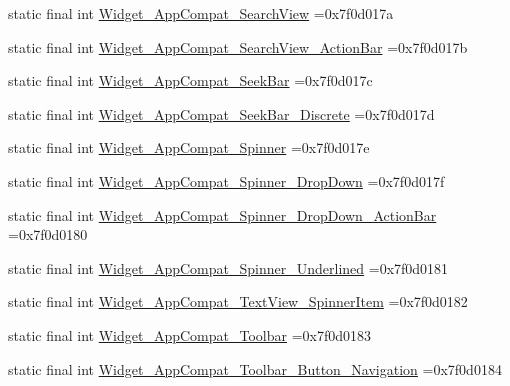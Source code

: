 \begin{DoxyCompactItemize}
\item 
static final int \mbox{\hyperlink{classbr_1_1unb_1_1cic_1_1mp_1_1marketmaster_1_1R_1_1style_a9e0e37ec3b26412ae96a0e26cb6fa6d5}{Widget\+\_\+\+App\+Compat\+\_\+\+Search\+View}} =0x7f0d017a
\item 
static final int \mbox{\hyperlink{classbr_1_1unb_1_1cic_1_1mp_1_1marketmaster_1_1R_1_1style_a876d54ec1ef6e642d38963741fdb6885}{Widget\+\_\+\+App\+Compat\+\_\+\+Search\+View\+\_\+\+Action\+Bar}} =0x7f0d017b
\item 
static final int \mbox{\hyperlink{classbr_1_1unb_1_1cic_1_1mp_1_1marketmaster_1_1R_1_1style_a63f10b1d7a6879efe363c3b0de6fe0ad}{Widget\+\_\+\+App\+Compat\+\_\+\+Seek\+Bar}} =0x7f0d017c
\item 
static final int \mbox{\hyperlink{classbr_1_1unb_1_1cic_1_1mp_1_1marketmaster_1_1R_1_1style_a8a82fc853d980be297fcaf2ab8aef32f}{Widget\+\_\+\+App\+Compat\+\_\+\+Seek\+Bar\+\_\+\+Discrete}} =0x7f0d017d
\item 
static final int \mbox{\hyperlink{classbr_1_1unb_1_1cic_1_1mp_1_1marketmaster_1_1R_1_1style_a98beb7e64939e17c09fbdcc2d6833420}{Widget\+\_\+\+App\+Compat\+\_\+\+Spinner}} =0x7f0d017e
\item 
static final int \mbox{\hyperlink{classbr_1_1unb_1_1cic_1_1mp_1_1marketmaster_1_1R_1_1style_a4336a5228a4684743e576a7ebe130cd0}{Widget\+\_\+\+App\+Compat\+\_\+\+Spinner\+\_\+\+Drop\+Down}} =0x7f0d017f
\item 
static final int \mbox{\hyperlink{classbr_1_1unb_1_1cic_1_1mp_1_1marketmaster_1_1R_1_1style_a0feb99245f9f133052f245c3181e7586}{Widget\+\_\+\+App\+Compat\+\_\+\+Spinner\+\_\+\+Drop\+Down\+\_\+\+Action\+Bar}} =0x7f0d0180
\item 
static final int \mbox{\hyperlink{classbr_1_1unb_1_1cic_1_1mp_1_1marketmaster_1_1R_1_1style_ab47fb3eff7a41cc615313fe523ec6109}{Widget\+\_\+\+App\+Compat\+\_\+\+Spinner\+\_\+\+Underlined}} =0x7f0d0181
\item 
static final int \mbox{\hyperlink{classbr_1_1unb_1_1cic_1_1mp_1_1marketmaster_1_1R_1_1style_a6d424e808466306ad14ba826b45c12e2}{Widget\+\_\+\+App\+Compat\+\_\+\+Text\+View\+\_\+\+Spinner\+Item}} =0x7f0d0182
\item 
static final int \mbox{\hyperlink{classbr_1_1unb_1_1cic_1_1mp_1_1marketmaster_1_1R_1_1style_a375127cb8a870c0e996a513e7f10559e}{Widget\+\_\+\+App\+Compat\+\_\+\+Toolbar}} =0x7f0d0183
\item 
static final int \mbox{\hyperlink{classbr_1_1unb_1_1cic_1_1mp_1_1marketmaster_1_1R_1_1style_af8a7668cfb97508efcb3efcb99c7b502}{Widget\+\_\+\+App\+Compat\+\_\+\+Toolbar\+\_\+\+Button\+\_\+\+Navigation}} =0x7f0d0184

\end{DoxyCompactItemize}
